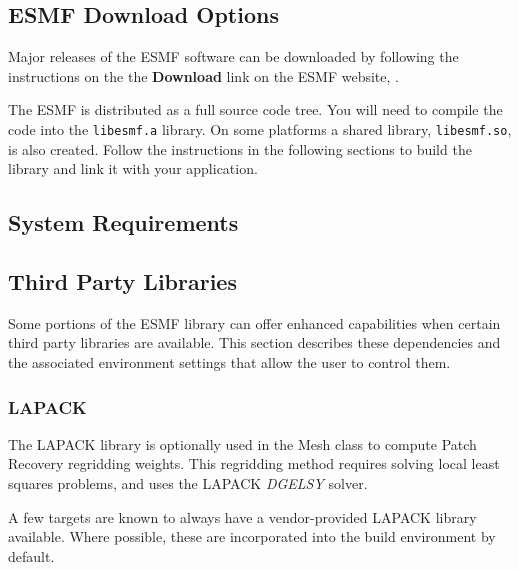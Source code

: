 
\subsection{ESMF Download Options}

Major releases of the ESMF software can be downloaded by following
the instructions on the the {\bf Download} link on the ESMF 
website, .

The ESMF is distributed as a full source code tree.  You will need
to compile the code into the {\tt libesmf.a} library.
On some platforms a shared library, {\tt libesmf.so}, is also created.
Follow the instructions in the following sections
to build the library and link it with your application.


\subsection{System Requirements}
\label{sec:systemreq}


\subsection{Third Party Libraries}
\label{sec:ThirdParty}

Some portions of the ESMF library can offer enhanced capabilities when
certain third party libraries are available. This section describes
these dependencies and the associated environment settings
that allow the user to control them.

\subsubsection{LAPACK}
\label{sec:lapack}
The LAPACK library is optionally used in the Mesh class to
compute Patch Recovery regridding weights.  This regridding method requires
solving local least squares problems, and uses the LAPACK {\it DGELSY} solver.

A few targets are known to always have a vendor-provided LAPACK
library available.  Where possible, these are incorporated into
the build environment by default.  

